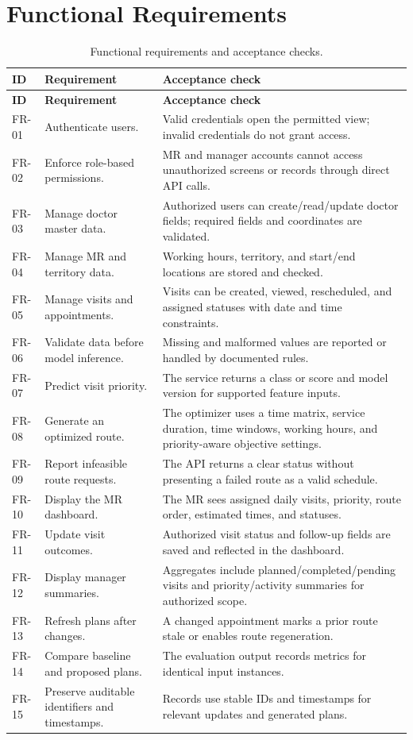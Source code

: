 \documentclass[12pt,a4paper,oneside]{report}
\begin{document}
\section{Functional Requirements}
\begin{longtable}{p{20mm}p{50mm}p{61mm}}
\caption{Functional requirements and acceptance checks.}\label{tab:functional-req}\\
\toprule
\textbf{ID} & \textbf{Requirement} & \textbf{Acceptance check}\\
\midrule
\endfirsthead
\toprule
\textbf{ID} & \textbf{Requirement} & \textbf{Acceptance check}\\
\midrule
\endhead
FR-01 & Authenticate users. & Valid credentials open the permitted view; invalid credentials do not grant access.\\
FR-02 & Enforce role-based permissions. & MR and manager accounts cannot access unauthorized screens or records through direct API calls.\\
FR-03 & Manage doctor master data. & Authorized users can create/read/update doctor fields; required fields and coordinates are validated.\\
FR-04 & Manage MR and territory data. & Working hours, territory, and start/end locations are stored and checked.\\
FR-05 & Manage visits and appointments. & Visits can be created, viewed, rescheduled, and assigned statuses with date and time constraints.\\
FR-06 & Validate data before model inference. & Missing and malformed values are reported or handled by documented rules.\\
FR-07 & Predict visit priority. & The service returns a class or score and model version for supported feature inputs.\\
FR-08 & Generate an optimized route. & The optimizer uses a time matrix, service duration, time windows, working hours, and priority-aware objective settings.\\
FR-09 & Report infeasible route requests. & The API returns a clear status without presenting a failed route as a valid schedule.\\
FR-10 & Display the MR dashboard. & The MR sees assigned daily visits, priority, route order, estimated times, and statuses.\\
FR-11 & Update visit outcomes. & Authorized visit status and follow-up fields are saved and reflected in the dashboard.\\
FR-12 & Display manager summaries. & Aggregates include planned/completed/pending visits and priority/activity summaries for authorized scope.\\
FR-13 & Refresh plans after changes. & A changed appointment marks a prior route stale or enables route regeneration.\\
FR-14 & Compare baseline and proposed plans. & The evaluation output records metrics for identical input instances.\\
FR-15 & Preserve auditable identifiers and timestamps. & Records use stable IDs and timestamps for relevant updates and generated plans.\\
\bottomrule
\end{longtable}
\end{document}
